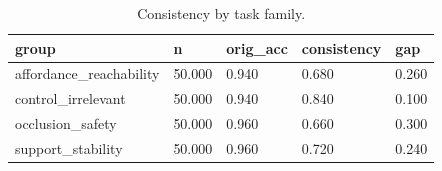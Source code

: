 \begin{table}[t]
\centering
\begin{tabular}{lllll}
\toprule
group & n & orig_acc & consistency & gap \\
\midrule
affordance_reachability & 50.000 & 0.940 & 0.680 & 0.260 \\
control_irrelevant & 50.000 & 0.940 & 0.840 & 0.100 \\
occlusion_safety & 50.000 & 0.960 & 0.660 & 0.300 \\
support_stability & 50.000 & 0.960 & 0.720 & 0.240 \\
\bottomrule
\end{tabular}
\caption{Consistency by task family.}
\end{table}

